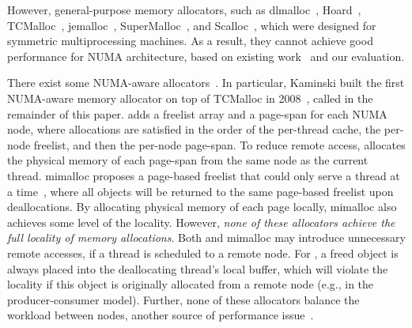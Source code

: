 However, general-purpose memory allocators, such as dlmalloc~\cite{dlmalloc},  Hoard~\cite{Hoard}, TCMalloc~\cite{tcmalloc}, jemalloc~\cite{jemalloc}, SuperMalloc~\cite{supermalloc}, and  Scalloc~\cite{Scalloc}, which were designed for symmetric multiprocessing machines. As a result, they cannot achieve good performance for NUMA architecture, based on existing work~\cite{tcmallocnew, yang2019jarena} and our evaluation. 

There exist some NUMA-aware allocators~\cite{ tcmallocnew, kim2013node, yang2019jarena, mimalloc}. 
In particular, Kaminski built the first NUMA-aware memory allocator on top of TCMalloc in 2008~\cite{tcmallocnew}, called \TN{} in the remainder of this paper. \TN{} adds a freelist array and a page-span for each NUMA node, where allocations are satisfied in the order of the per-thread cache, the per-node freelist, and then the per-node page-span. To reduce remote access, \TN{} allocates the physical memory of each page-span from the same node as the current thread. mimalloc proposes a page-based freelist that could only serve a thread at a time~\cite{mimalloc}, where all objects will be returned to the same page-based freelist upon deallocations. By allocating physical memory of each page locally, mimalloc also achieves some level of the locality. However, \textit{none of these allocators achieve the full locality of memory allocations}. Both \TN{} and mimalloc may introduce unnecessary remote accesses, if a thread is scheduled to a remote node. For \TN{}, a freed object is always placed into the deallocating thread's local buffer, which will violate the locality if this object is originally allocated from a remote node  (e.g., in the producer-consumer model). 
Further, none of these allocators balance the workload between nodes, another source of performance issue~\cite{Dashti:2013:TMH:2451116.2451157}. 



